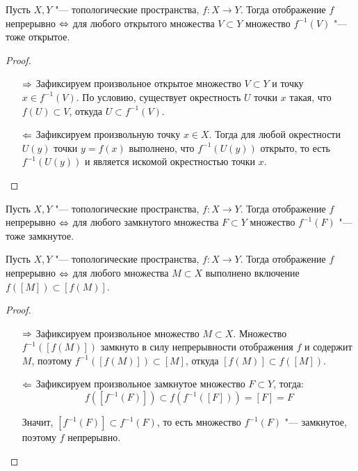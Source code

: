 \begin{proposition}
	Пусть $X, Y$ "--- топологические пространства, $f: X \to Y$. Тогда ото\-бра\-жение $f$ непрерывно $\Leftrightarrow$ для любого открытого множества $V \subset Y$ множество $f^{-1}(V)$ "--- тоже открытое.
\end{proposition}

\begin{proof}~
	\begin{itemize}
		\item[$\Rightarrow$] Зафиксируем произвольное открытое множество $V \subset Y$ и точку $x \in f^{-1}(V)$. По условию, существует окрестность $U$ точки $x$ такая, что $f(U) \subset V$, откуда ${U \subset f^{-1}(V)}$.
		
		\item[$\Leftarrow$] Зафиксируем произвольную точку $x \in X$. Тогда для любой окрестности $U(y)$ точки $y= f(x)$ выполнено, что $f^{-1}(U(y))$ открыто, то есть $f^{-1}(U(y))$ и является искомой окрестностью точки $x$.\qedhere
	\end{itemize}
\end{proof}

\begin{corollary}
	Пусть $X, Y$ "--- топологические пространства, $f: X \to Y$. Тогда отображение $f$ непрерывно $\Leftrightarrow$ для любого замкнутого множества $F \subset Y$ множество $f^{-1}(F)$ "--- тоже замкнутое.
\end{corollary}

\begin{proposition}
	Пусть $X, Y$ "--- топологические пространства, $f: X \to Y$. Тогда отображение $f$ непрерывно $\Leftrightarrow$ для любого множества $M \subset X$ выполнено включение $f([M]) \subset [f(M)]$.
\end{proposition}

\begin{proof}~
	\begin{itemize}
		\item[$\Rightarrow$] Зафиксируем произвольное множество $M \subset X$. Множество $f^{-1}([f(M)])$ замкнуто в силу непрерывности отображения $f$ и содержит $M$, поэтому $f^{-1}([f(M)]) \subset [M]$, откуда $[f(M)] \subset f([M])$.
		
		\item[$\Leftarrow$] Зафиксируем произвольное замкнутое множество $F \subset Y$, тогда:
		\[f([f^{-1}(F)]) \subset f(f^{-1}([F])) = [F] = F\]
		
		Значит, $[f^{-1}(F)] \subset f^{-1}(F)$, то есть множество $f^{-1}(F)$ "--- замкнутое, поэтому $f$ непрерывно.\qedhere
	\end{itemize}
\end{proof}

